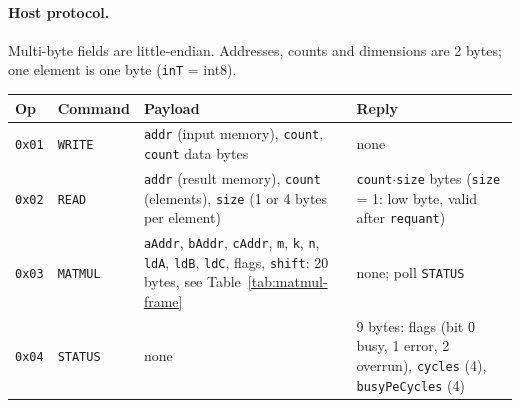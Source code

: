 \documentclass{article}
\begin{document}
\paragraph{Host protocol.}
Multi-byte fields are little-endian. Addresses, counts and dimensions are 2 bytes; one element is one byte (\texttt{inT} = int8).

\noindent\begin{tabularx}{\linewidth}{@{} l l Y Y @{}}
  \toprule
  \textbf{Op} & \textbf{Command} & \textbf{Payload} & \textbf{Reply} \\
  \midrule
    \texttt{0x01} & \texttt{WRITE}  & \texttt{addr} (input memory), \texttt{count}, \texttt{count} data bytes & none \\
  \texttt{0x02} & \texttt{READ}   & \texttt{addr} (result memory), \texttt{count} (elements), \texttt{size} (1 or 4 bytes per element)
                & \texttt{count}$\cdot$\texttt{size} bytes (\texttt{size} = 1: low byte, valid after \texttt{requant}) \\
  \texttt{0x03} & \texttt{MATMUL} & \texttt{aAddr}, \texttt{bAddr}, \texttt{cAddr}, \texttt{m}, \texttt{k}, \texttt{n},
                  \texttt{ldA}, \texttt{ldB}, \texttt{ldC}, flags, \texttt{shift}: 20 bytes, see Table~\ref{tab:matmul-frame}
                & none; poll \texttt{STATUS} \\
  \texttt{0x04} & \texttt{STATUS} & none & 9 bytes: flags (bit 0 busy, 1 error, 2 overrun), \texttt{cycles} (4), \texttt{busyPeCycles} (4) \\
  \bottomrule
\end{tabularx}
\end{document}
